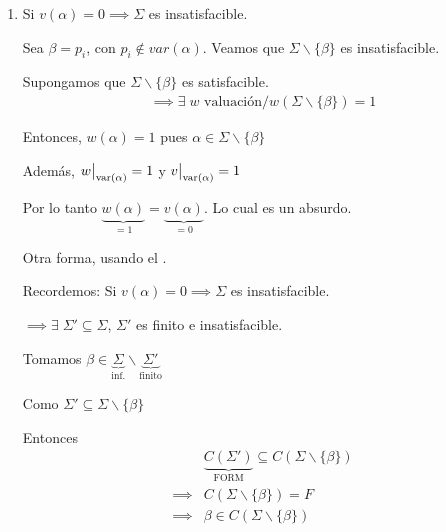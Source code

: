\begin{itemize}
\begin{enumerate}
\begin{enumerate}
                    \item Si $v(\alpha) = 0 \implies \Sigma$ es 
                        insatisfacible.

                        Sea $\beta = p_i$, con $p_i \notin var(\alpha)$.
                        Veamos que $\Sigma \backslash \{ \beta \}$ es
                        insatisfacible.

                        Supongamos que $\Sigma \backslash \{ \beta \}$ es
                        satisfacible.
                        \begin{gather*}
                            \implies \exists \; w \text{ valuación} /
                            w(\Sigma \backslash \{\beta\}) = 1
                        \end{gather*}

                        Entonces, $w(\alpha) = 1$ pues
                        $\alpha \in \Sigma \backslash \{ \beta \}$

                        Además, $\frest{w}{\mathrm{var}(\alpha)} = 1$ y
                        $\frest{v}{\mathrm{var}(\alpha)} = 1$

                        Por lo tanto $\underbrace{w(\alpha)}_{=1} 
                            = \underbrace{v(\alpha)}_{= 0}$.
                        Lo cual es un absurdo.

                        \bigskip
                        Otra forma, usando el .

                        Recordemos: Si $v(\alpha) = 0 \implies \Sigma$ es 
                        insatisfacible.

                        $\implies \exists \; \Sigma' \subseteq \Sigma$, 
                        $\Sigma'$ es finito e insatisfacible.

                        Tomamos $\beta \in \underbrace{\Sigma}_{\text{inf.}} 
                        \backslash \underbrace{\Sigma'}_{\text{finito}}$

                        Como $\Sigma' \subseteq \Sigma \backslash \{\beta\}$

                        Entonces
                        \begin{align*}
                            & \underbrace{C(\Sigma')}_{\mathrm{FORM}} 
                            \subseteq C(\Sigma \backslash \{\beta\}) \\
                            \implies & C(\Sigma \backslash \{ \beta \}) = F \\
                            \implies & \beta \in 
                            C(\Sigma\backslash \{ \beta \})
                        \end{align*}


\end{enumerate}
\end{enumerate}
\end{itemize}
